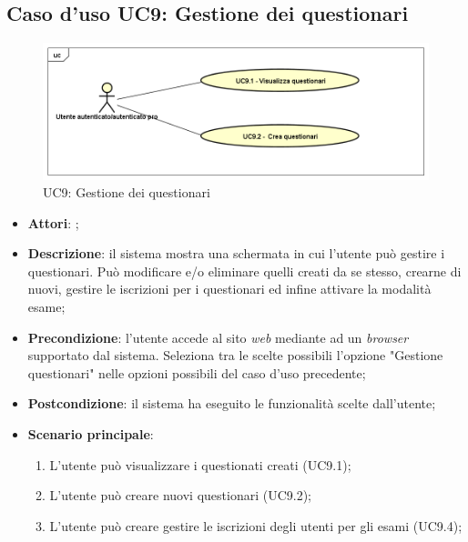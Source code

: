 \subsection{Caso d'uso UC9: Gestione dei questionari}
\label{UC9}
\begin{figure}[h]
	\centering
	\includegraphics[scale=0.5,keepaspectratio]{UML/UC9.png}
	\caption{UC9: Gestione dei questionari}
\end{figure}
\FloatBarrier
\begin{itemize}
	\item \textbf{Attori}: \uaupro;
	\item \textbf{Descrizione}: il sistema mostra una schermata in cui l'utente può gestire i questionari. Può modificare e/o eliminare quelli creati da se stesso, crearne di nuovi, gestire le iscrizioni per i questionari ed infine attivare la modalità esame; 
	\item \textbf{Precondizione}: l'utente accede al sito \textit{web} mediante ad un \textit{browser} supportato dal sistema. Seleziona tra le scelte possibili l'opzione "Gestione questionari" nelle opzioni possibili del caso d'uso precedente;
	\item \textbf{Postcondizione}: il sistema ha eseguito le funzionalità scelte dall'utente;
	\item \textbf{Scenario principale}:
		\begin{enumerate}
			\item L'utente può visualizzare i questionati creati (UC9.1);
			\item L'utente può creare nuovi questionari (UC9.2);
			\item L'utente può creare gestire le iscrizioni degli utenti per gli esami (UC9.4);
		\end{enumerate}
\end{itemize}
							
